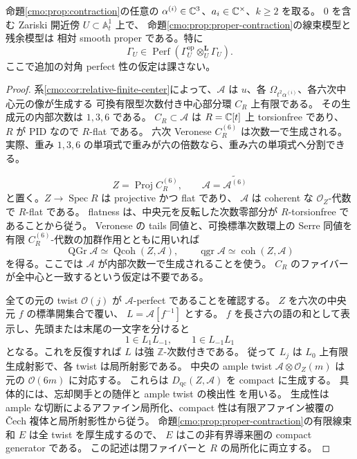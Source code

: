\begin{theorem}
\label{cmo:thm:relative-smoothness}
命題\ref{cmo:prop:contraction}の任意の
$\alpha^{(i)}\in\mathbb C^3$、$a_i\in\mathbb C^\times$、$k\ge2$ を取る。
$0$ を含む Zariski 開近傍 $U\subset\mathbb A^1_t$ 上で、
命題\ref{cmo:prop:proper-contraction}の線束模型と残余模型は
相対 smooth proper である。特に
\begin{equation}\label{cmo:eq:relative-diagonal}
 \Gamma_U\in\operatorname{Perf}\!\left(
       \Gamma_U^{\mathrm{op}}\otimes_U^{\mathbf L}\Gamma_U\right).
\end{equation}
ここで追加の対角 perfect 性の仮定は課さない。
\end{theorem}
\begin{proof}
系\ref{cmo:cor:relative-finite-center}によって、$\mathscr A$ は
$u$、各 $\Omega_{t^2\alpha^{(i)}}$、各六次中心元の像が生成する
可換有限型次数付き中心部分環 $C_R$ 上有限である。
その生成元の内部次数は $1,3,6$ である。
$C_R\subset\mathscr A$ は $R=\mathbb C[t]$ 上 torsionfree であり、
$R$ が PID なので $R$-flat である。
六次 Veronese $C_R^{(6)}$ は次数一で生成される。
実際、重み $1,3,6$ の単項式で重みが六の倍数なら、重み六の単項式へ分割できる。

\[
 Z=\operatorname{Proj}C_R^{(6)},\qquad
 \mathcal A=\widetilde{\mathscr A^{(6)}}
\]
と置く。$Z\to\operatorname{Spec}R$ は projective かつ flat であり、
$\mathcal A$ は coherent な $\mathcal O_Z$-代数で $R$-flat である。
flatness は、中央元を反転した次数零部分が $R$-torsionfree であることから従う。
Veronese の tails 同値と、可換標準次数環上の Serre 同値を
有限 $C_R^{(6)}$-代数の加群作用とともに用いれば
\[
 \operatorname{QGr}\mathscr A\simeq\operatorname{Qcoh}(Z,\mathcal A),\qquad
 \operatorname{qgr}\mathscr A\simeq\operatorname{coh}(Z,\mathcal A)
\]
を得る。ここでは $\mathscr A$ が内部次数一で生成されることを使う。
$C_R$ のファイバーが全中心と一致するという仮定は不要である。

全ての元の twist $\mathcal O(j)$ が $\mathcal A$-perfect であることを確認する。
$Z$ を六次の中央元 $f$ の標準開集合で覆い、
$L=\mathscr A[f^{-1}]$ とする。
$f$ を長さ六の語の和として表示し、先頭または末尾の一文字を分けると
\[
 1\in L_1L_{-1},\qquad 1\in L_{-1}L_1
\]
となる。これを反復すれば $L$ は強 $\mathbb Z$-次数付きである。
従って $L_j$ は $L_0$ 上有限生成射影で、各 twist は局所射影である。
中央の ample twist $\mathcal A\otimes\mathcal O_Z(m)$ は
元の $\mathcal O(6m)$ に対応する。
これらは $D_{\mathrm{qc}}(Z,\mathcal A)$ を compact に生成する。
具体的には、忘却関手との随伴と ample twist の検出性
\cite[Tag~0BQR]{CMOStacksDerived}を用いる。
生成性は ample な切断によるアファイン局所化、compact 性は有限アファイン被覆の
\v Cech 複体と局所射影性から従う。
命題\ref{cmo:prop:proper-contraction}の有限線束和 $E$ は全 twist を厚生成するので、
$E$ はこの非有界導来圏の compact generator である。
この記述は閉ファイバーと $R$ の局所化に両立する。


\end{proof}
